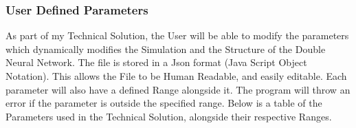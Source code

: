 \begin{flushleft}
            \subsubsection{User Defined Parameters}
                As part of my Technical Solution, the User will be able to modify the parameters which dynamically modifies the Simulation
                and the Structure of the Double Neural Network. The file is stored in a Json format (Java Script Object Notation).
                This allows the File to be Human Readable, and easily editable. Each parameter will also have a defined Range alongside it.
                The program will throw an error if the parameter is outside the specified range. Below is a table of the Parameters used in
                the Technical Solution, alongside their respective Ranges. \\

                \vspace{0.5cm}


\end{flushleft}
